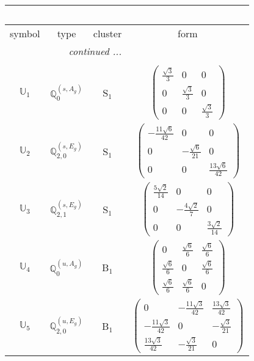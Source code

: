 \documentclass[fleqn,10pt,landscape]{article}
\begin{document}
\begin{itemize}
\begin{center}
\begin{longtable}{c|c|c|c}
\multicolumn{3}{l}{\tablename\ \thetable{}} \\
 \hline \hline
symbol & type & cluster & form \\ \hline \endhead

 \hline \hline
\multicolumn{3}{r}{\footnotesize\it continued ...} \\ \endfoot

 \hline \hline
\multicolumn{3}{r}{} \\ \endlastfoot

$ \mathbb{U}_{1} $ & $\mathbb{Q}_{0}^{(s,A_{g})}$ & S$_{1}$ & $\begin{pmatrix} \frac{\sqrt{3}}{3} & 0 & 0 \\ 0 & \frac{\sqrt{3}}{3} & 0 \\ 0 & 0 & \frac{\sqrt{3}}{3} \end{pmatrix}$ \\
$ \mathbb{U}_{2} $ & $\mathbb{Q}_{2,0}^{(s,E_{g})}$ & S$_{1}$ & $\begin{pmatrix} - \frac{11 \sqrt{6}}{42} & 0 & 0 \\ 0 & - \frac{\sqrt{6}}{21} & 0 \\ 0 & 0 & \frac{13 \sqrt{6}}{42} \end{pmatrix}$ \\
$ \mathbb{U}_{3} $ & $\mathbb{Q}_{2,1}^{(s,E_{g})}$ & S$_{1}$ & $\begin{pmatrix} \frac{5 \sqrt{2}}{14} & 0 & 0 \\ 0 & - \frac{4 \sqrt{2}}{7} & 0 \\ 0 & 0 & \frac{3 \sqrt{2}}{14} \end{pmatrix}$ \\ \hline
$ \mathbb{U}_{4} $ & $\mathbb{Q}_{0}^{(u,A_{g})}$ & B$_{1}$ & $\begin{pmatrix} 0 & \frac{\sqrt{6}}{6} & \frac{\sqrt{6}}{6} \\ \frac{\sqrt{6}}{6} & 0 & \frac{\sqrt{6}}{6} \\ \frac{\sqrt{6}}{6} & \frac{\sqrt{6}}{6} & 0 \end{pmatrix}$ \\
$ \mathbb{U}_{5} $ & $\mathbb{Q}_{2,0}^{(u,E_{g})}$ & B$_{1}$ & $\begin{pmatrix} 0 & - \frac{11 \sqrt{3}}{42} & \frac{13 \sqrt{3}}{42} \\ - \frac{11 \sqrt{3}}{42} & 0 & - \frac{\sqrt{3}}{21} \\ \frac{13 \sqrt{3}}{42} & - \frac{\sqrt{3}}{21} & 0 \end{pmatrix}$ \\

\end{longtable}
\end{center}
\end{itemize}
\end{document}
